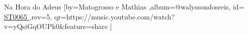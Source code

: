 \beginsong
{Na Hora do Adeus %
}[by={Matogrosso e Mathias %
},album={@walyssondosreis},
id={\href{https://music.youtube.com/watch?v=yQsiGqOUPk0&feature=share %
}{ ST0065 %
}},rev={5}, %
qr={https://music.youtube.com/watch?v=yQsiGqOUPk0&feature=share %
}]
\beginverse 
